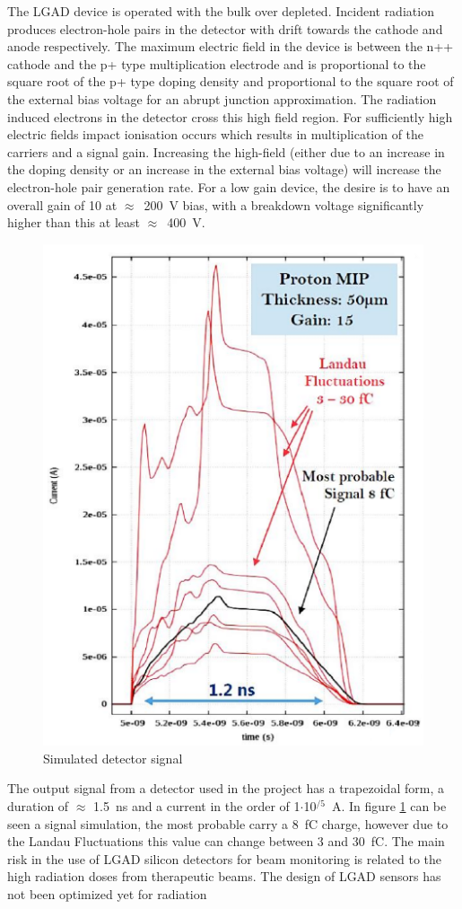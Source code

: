 \noindent The LGAD device is operated with the bulk over depleted. Incident radiation produces electron-hole
pairs in the detector with drift towards the cathode and anode respectively. The maximum
electric field in the device is between the n++ cathode and the p+ type multiplication electrode and is
proportional to the square root of the p+ type doping density and proportional to the square root of the
external bias voltage for an abrupt junction approximation.
The radiation induced electrons in the detector cross this high field region. For sufficiently
high electric fields impact ionisation occurs which results in multiplication of the carriers and a
signal gain.
Increasing the high-field (either due to an increase in the doping density or
an increase in the external bias voltage) will increase the electron-hole pair generation rate. For a
low gain device, the desire is to have an overall gain of 10 at $\approx$~200~V bias, with a breakdown voltage
significantly higher than this at least $\approx$~400~V.
\begin{figure}[H]
	\centering
	\includegraphics[width=0.35\linewidth]{IMG/ch2/LGAD_Signal}
	\caption{Simulated detector signal}
	\label{fig:signal}
\end{figure}
\noindent The output signal from a detector used in the project has a trapezoidal form, a duration of $\approx$ 1.5~ns and a current in the order of 1$\cdot$10$^{/5}$~A.
In figure \ref{fig:signal} can be seen a signal simulation, the most probable carry a 8~fC charge, however due to the Landau Fluctuations this value can change between 3 and 30~fC.
\noindent The main risk in
the use of LGAD silicon detectors for beam monitoring is related to the high radiation doses from
therapeutic beams. The design of LGAD sensors has not been optimized yet for radiation
